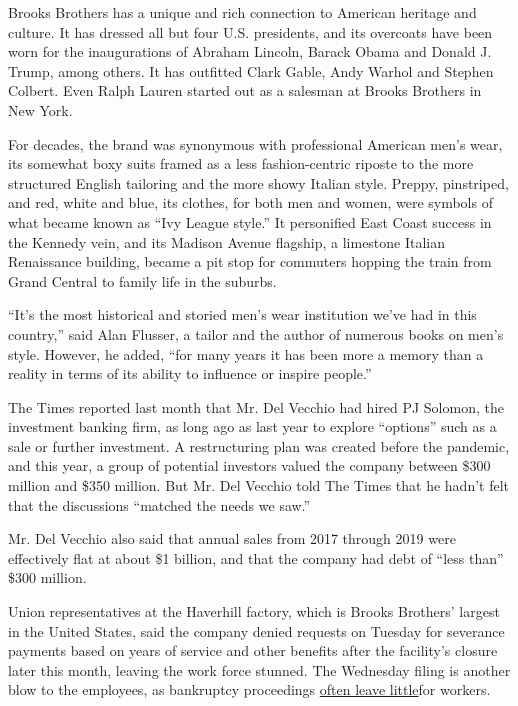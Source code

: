 Brooks Brothers has a unique and rich connection to American heritage
and culture. It has dressed all but four U.S. presidents, and its
overcoats have been worn for the inaugurations of Abraham Lincoln,
Barack Obama and Donald J. Trump, among others. It has outfitted Clark
Gable, Andy Warhol and Stephen Colbert. Even Ralph Lauren started out as
a salesman at Brooks Brothers in New York.

For decades, the brand was synonymous with professional American men's
wear, its somewhat boxy suits framed as a less fashion-centric riposte
to the more structured English tailoring and the more showy Italian
style. Preppy, pinstriped, and red, white and blue, its clothes, for
both men and women, were symbols of what became known as ``Ivy League
style.'' It personified East Coast success in the Kennedy vein, and its
Madison Avenue flagship, a limestone Italian Renaissance building,
became a pit stop for commuters hopping the train from Grand Central to
family life in the suburbs.

``It's the most historical and storied men's wear institution we've had
in this country,'' said Alan Flusser, a tailor and the author of
numerous books on men's style. However, he added, ``for many years it
has been more a memory than a reality in terms of its ability to
influence or inspire people.''

The Times reported last month that Mr. Del Vecchio had hired PJ Solomon,
the investment banking firm, as long ago as last year to explore
``options'' such as a sale or further investment. A restructuring plan
was created before the pandemic, and this year, a group of potential
investors valued the company between \$300 million and \$350 million.
But Mr. Del Vecchio told The Times that he hadn't felt that the
discussions ``matched the needs we saw.''

Mr. Del Vecchio also said that annual sales from 2017 through 2019 were
effectively flat at about \$1 billion, and that the company had debt of
``less than'' \$300 million.

Union representatives at the Haverhill factory, which is Brooks
Brothers' largest in the United States, said the company denied requests
on Tuesday for severance payments based on years of service and other
benefits after the facility's closure later this month, leaving the work
force stunned. The Wednesday filing is another blow to the employees, as
bankruptcy proceedings
\href{https://www.nytimes3xbfgragh.onion/2020/01/16/business/barneys-new-york-employees-severance.html}{often
leave little}for workers.

